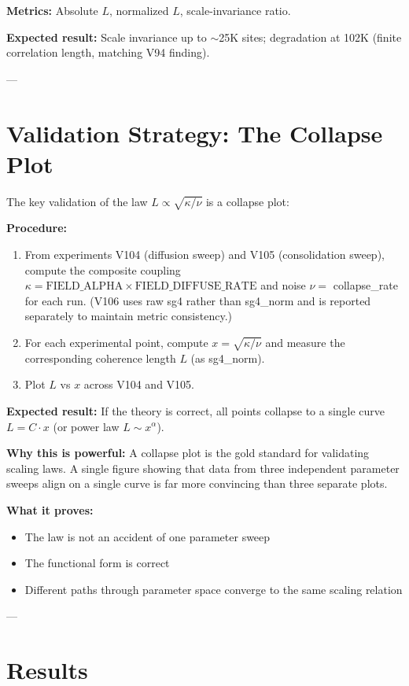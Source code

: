 \documentclass[11pt]{article}
\begin{document}
\textbf{Metrics:} Absolute $L$, normalized $L$, scale-invariance ratio.

\textbf{Expected result:} Scale invariance up to $\sim$25K sites; degradation at 102K (finite correlation length, matching V94 finding).

---

\section{Validation Strategy: The Collapse Plot}

The key validation of the law $L \propto \sqrt{\kappa/\nu}$ is a collapse plot:

\textbf{Procedure:}
\begin{enumerate}
  \item From experiments V104 (diffusion sweep) and V105 (consolidation sweep), compute the composite coupling $\kappa = \text{FIELD\_ALPHA} \times \text{FIELD\_DIFFUSE\_RATE}$ and noise $\nu = $ collapse\_rate for each run. (V106 uses raw sg4 rather than sg4\_norm and is reported separately to maintain metric consistency.)
  \item For each experimental point, compute $x = \sqrt{\kappa/\nu}$ and measure the corresponding coherence length $L$ (as sg4\_norm).
  \item Plot $L$ vs $x$ across V104 and V105.
\end{enumerate}

\textbf{Expected result:} If the theory is correct, all points collapse to a single curve $L = C \cdot x$ (or power law $L \sim x^\alpha$).

\textbf{Why this is powerful:} A collapse plot is the gold standard for validating scaling laws. A single figure showing that data from three independent parameter sweeps align on a single curve is far more convincing than three separate plots.

\textbf{What it proves:}
\begin{itemize}
  \item The law is not an accident of one parameter sweep
  \item The functional form is correct
  \item Different paths through parameter space converge to the same scaling relation
\end{itemize}

---

\section{Results}
\label{sec:results}
\end{document}
